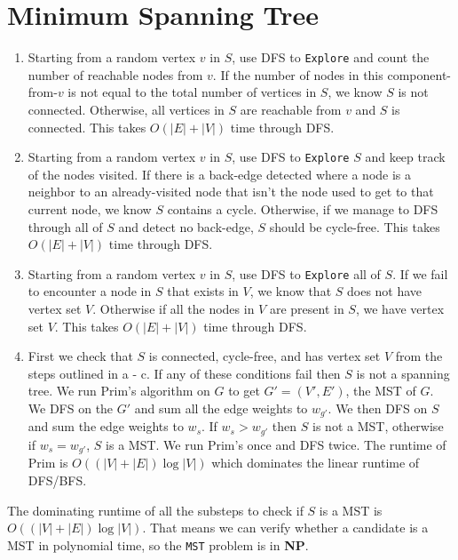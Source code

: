 \documentclass{article}
\begin{document}
\section{Minimum Spanning Tree}
\begin{enumerate}
    \item Starting from a random vertex $v$ in $S$, use DFS to \texttt{Explore} and count the number of reachable nodes from $v$.
            If the number of nodes in this component-from-$v$ is not equal to the total number of vertices in $S$, we know $S$ is not connected.
            Otherwise, all vertices in $S$ are reachable from $v$ and $S$ is connected. This takes $O(|E| + |V|)$ time through DFS.

    \item Starting from a random vertex $v$ in $S$, use DFS to \texttt{Explore} $S$ and keep track of the nodes visited. 
            If there is a back-edge detected where a node is a neighbor to an already-visited node that isn't the node used to get to that current node, we know $S$ contains a cycle.
            Otherwise, if we manage to DFS through all of $S$ and detect no back-edge, $S$ should be cycle-free. This takes $O(|E| + |V|)$ time through DFS.
            
    \item Starting from a random vertex $v$ in $S$, use DFS to \texttt{Explore} all of $S$. If we fail to encounter a node in $S$ that exists in $V$, we know that $S$ does not have vertex set $V$.
            Otherwise if all the nodes in $V$ are present in $S$, we have vertex set $V$. This takes $O(|E| + |V|)$ time through DFS.

    \item First we check that $S$ is connected, cycle-free, and has vertex set $V$ from the steps outlined in a - c. If any of these conditions fail then $S$ is not a spanning tree.
    We run Prim's algorithm on $G$ to get $G' = (V', E')$, the MST of $G$. We DFS on the $G'$ and sum all the edge weights to $w_{g'}$. We then DFS on $S$ and sum the edge weights to $w_{s}$.
    If $w_s > w_{g'}$ then $S$ is not a MST, otherwise if $w_s = w_{g'}$, $S$ is a MST. We run Prim's once and DFS twice. The runtime of Prim is $O((|V| + |E|)\log |V|)$ which dominates the linear runtime of DFS/BFS.
\end{enumerate}

The dominating runtime of all the substeps to check if $S$ is a MST is $O((|V| + |E|)\log |V|)$.
That means we can verify whether a candidate is a MST in polynomial time, so the \texttt{MST} problem is in \textbf{NP}.
\end{document}
